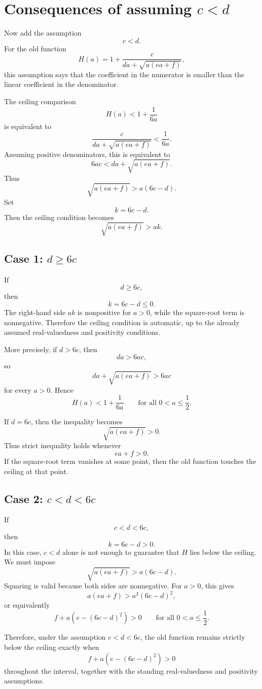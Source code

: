 \documentclass[11pt]{article}
\begin{document}
\section{Consequences of assuming \(c<d\)}

Now add the assumption
\[
\boxed{
c<d.
}
\]
For the old function
\[
H(a)
=
1+\frac{c}{da+\sqrt{a(ea+f)}},
\]
this assumption says that the coefficient in the numerator is smaller than the linear coefficient in the denominator.

The ceiling comparison
\[
H(a)<1+\frac{1}{6a}
\]
is equivalent to
\[
\frac{c}{da+\sqrt{a(ea+f)}}<\frac{1}{6a}.
\]
Assuming positive denominators, this is equivalent to
\[
6ac<da+\sqrt{a(ea+f)}.
\]
Thus
\[
\boxed{
\sqrt{a(ea+f)}>a(6c-d).
}
\]
Set
\[
k=6c-d.
\]
Then the ceiling condition becomes
\[
\boxed{
\sqrt{a(ea+f)}>ak.
}
\]

\subsection*{Case 1: \(d\ge 6c\)}

If
\[
\boxed{
d\ge 6c,
}
\]
then
\[
k=6c-d\le 0.
\]
The right-hand side \(ak\) is nonpositive for \(a>0\), while the square-root term is nonnegative.
Therefore the ceiling condition is automatic, up to the already assumed real-valuedness and positivity conditions.

More precisely, if \(d>6c\), then
\[
da>6ac,
\]
so
\[
da+\sqrt{a(ea+f)}>6ac
\]
for every \(a>0\).
Hence
\[
\boxed{
H(a)<1+\frac{1}{6a}
\qquad
\text{for all }0<a\le\frac12.
}
\]

If \(d=6c\), then the inequality becomes
\[
\sqrt{a(ea+f)}>0.
\]
Thus strict inequality holds whenever
\[
ea+f>0.
\]
If the square-root term vanishes at some point, then the old function touches the ceiling at that point.

\subsection*{Case 2: \(c<d<6c\)}

If
\[
\boxed{
c<d<6c,
}
\]
then
\[
k=6c-d>0.
\]
In this case, \(c<d\) alone is not enough to guarantee that \(H\) lies below the ceiling.
We must impose
\[
\sqrt{a(ea+f)}>a(6c-d).
\]
Squaring is valid because both sides are nonnegative.
For \(a>0\), this gives
\[
a(ea+f)>a^2(6c-d)^2,
\]
or equivalently
\[
\boxed{
f+a\left(e-(6c-d)^2\right)>0
\qquad
\text{for all }0<a\le\frac12.
}
\]

Therefore, under the assumption \(c<d<6c\), the old function remains strictly below the ceiling exactly when
\[
\boxed{
f+a\left(e-(6c-d)^2\right)>0
}
\]
throughout the interval, together with the standing real-valuedness and positivity assumptions.
\end{document}
